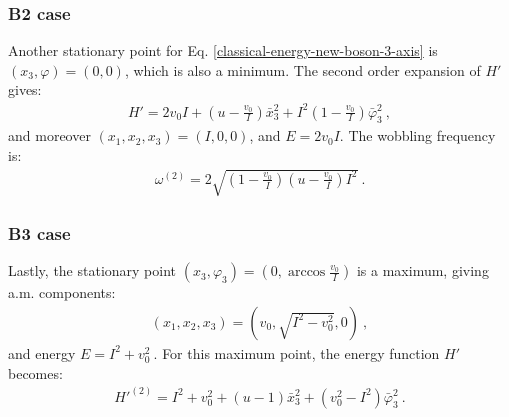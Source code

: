 \subsubsection*{B2 case}

Another stationary point for Eq. \ref{classical-energy-new-boson-3-axis} is $(x_3,\varphi)=(0,0)$, which is also a minimum. The second order expansion of $H'$ gives:
\begin{align}
    H'=2v_0I+\left(u-\frac{v_0}{I}\right)\bar{x}_3^2+I^2\left(1-\frac{v_0}{I}\right)\bar{\varphi}_3^2\ ,
\end{align}
and moreover $(x_1,x_2,x_3)=(I,0,0)$, and $E=2v_0I$. The wobbling frequency is:
\begin{align}
    \omega^{(2)}=2\sqrt{\left(1-\frac{v_0}{I}\right)\left(u-\frac{v_0}{I}\right)I^2}\ .
\end{align}

\subsubsection*{B3 case}

Lastly, the stationary point $(x_3,\varphi_3)=\left(0,\arccos\frac{v_0}{I}\right)$ is a maximum, giving a.m. components:
\begin{align}
    (x_1,x_2,x_3)=\left(v_0,\sqrt{I^2-v_0^2},0\right)\ ,
\end{align}
and energy $E=I^2+v_0^2\ .$ For this maximum point, the energy function $H'$ becomes:
\begin{align}
    H'^{(2)}=I^2+v_0^2+\left(u-1\right)\bar{x}_3^2+\left(v_0^2-I^2\right)\bar{\varphi}_3^2\ .
\end{align}

